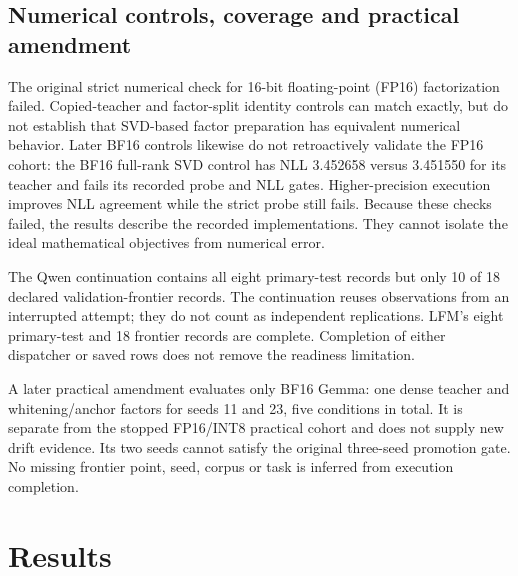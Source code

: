 \documentclass[conference]{IEEEtran}
\begin{document}
\subsection{Numerical controls, coverage and practical amendment}
The original strict numerical check for 16-bit floating-point (FP16) factorization failed. Copied-teacher and factor-split identity controls can match exactly, but do not establish that SVD-based factor preparation has equivalent numerical behavior. Later BF16 controls likewise do not retroactively validate the FP16 cohort: the BF16 full-rank SVD control has NLL 3.452658 versus 3.451550 for its teacher and fails its recorded probe and NLL gates. Higher-precision execution improves NLL agreement while the strict probe still fails. Because these checks failed, the results describe the recorded implementations. They cannot isolate the ideal mathematical objectives from numerical error.\par\smallskip
The Qwen continuation contains all eight primary-test records but only 10 of 18 declared validation-frontier records. The continuation reuses observations from an interrupted attempt; they do not count as independent replications. LFM's eight primary-test and 18 frontier records are complete. Completion of either dispatcher or saved rows does not remove the readiness limitation.\par\smallskip
A later practical amendment evaluates only BF16 Gemma: one dense teacher and whitening/anchor factors for seeds 11 and 23, five conditions in total. It is separate from the stopped FP16/INT8 practical cohort and does not supply new drift evidence. Its two seeds cannot satisfy the original three-seed promotion gate. No missing frontier point, seed, corpus or task is inferred from execution completion.\par\smallskip
\section{Results}
\end{document}
